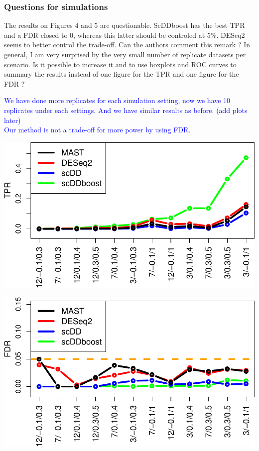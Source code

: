 \documentclass[]{article}
\begin{document}
\subsubsection{Questions for
simulations}\label{questions-for-simulations-1}

The results on Figures 4 and 5 are questionable. ScDDboost has the best
TPR and a FDR closed to 0, whereas this latter should be controled at
5\%. DESeq2 seems to better control the trade-off. Can the authors
comment this remark ? In general, I am very surprised by the very small
number of replicate datasets per scenario. Is it possible to increase it
and to use boxplots and ROC curves to summary the results instead of one
figure for the TPR and one figure for the FDR ?

\textcolor{blue}{We have done more replicates for each simulation setting, now we have 10 replicates under each settings. And we have similar results as before. (add plots later)\\
Our method is not a trade-off for more power by using FDR.}

\includegraphics{Revision_files/figure-latex/unnamed-chunk-3-1.pdf}

\includegraphics{Revision_files/figure-latex/unnamed-chunk-4-1.pdf}
\end{document}
